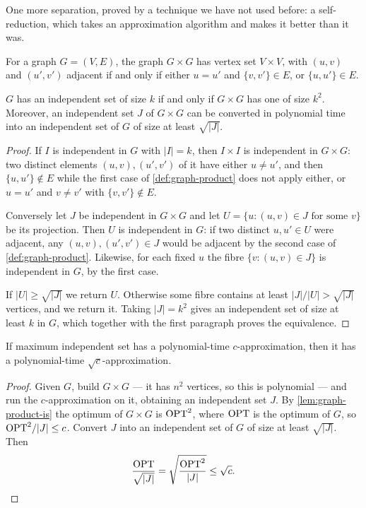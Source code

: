 One more separation, proved by a technique we have not used before: a
self-reduction, which takes an approximation algorithm and makes it better than
it was.

\begin{definition}\label{def:graph-product}
For a graph $G = (V,E)$, the graph $G \times G$ has vertex set $V \times V$,
with $(u,v)$ and $(u',v')$ adjacent if and only if either $u = u'$ and
$\{v,v'\} \in E$, or $\{u,u'\} \in E$.
\end{definition}

\begin{lemma}\label{lem:graph-product-is}
$G$ has an independent set of size $k$ if and only if $G \times G$ has one of
size $k^2$. Moreover, an independent set $J$ of $G \times G$ can be converted in
polynomial time into an independent set of $G$ of size at least $\sqrt{|J|}$.
\end{lemma}

\begin{proof}
If $I$ is independent in $G$ with $|I| = k$, then $I \times I$ is independent in
$G \times G$: two distinct elements $(u,v),(u',v')$ of it have either $u \ne u'$,
and then $\{u,u'\} \notin E$ while the first case of \cref{def:graph-product}
does not apply either, or $u = u'$ and $v \ne v'$ with $\{v,v'\} \notin E$.

Conversely let $J$ be independent in $G \times G$ and let
$U = \{u : (u,v) \in J \text{ for some } v\}$ be its projection. Then $U$ is
independent in $G$: if two distinct $u,u' \in U$ were adjacent, any
$(u,v),(u',v') \in J$ would be adjacent by the second case of
\cref{def:graph-product}. Likewise, for each fixed $u$ the fibre
$\{v : (u,v) \in J\}$ is independent in $G$, by the first case.

If $|U| \ge \sqrt{|J|}$ we return $U$. Otherwise some fibre contains at least
$|J|/|U| > \sqrt{|J|}$ vertices, and we return it. Taking $|J| = k^2$ gives an
independent set of size at least $k$ in $G$, which together with the first
paragraph proves the equivalence.
\end{proof}

\begin{lemma}\label{lem:is-self-reduction}
If maximum independent set has a polynomial-time $c$-approximation, then it has
a polynomial-time $\sqrt{c}$-approximation.
\end{lemma}

\begin{proof}
Given $G$, build $G \times G$ --- it has $n^2$ vertices, so this is polynomial
--- and run the $c$-approximation on it, obtaining an independent set $J$. By
\cref{lem:graph-product-is} the optimum of $G \times G$ is $\mathrm{OPT}^2$, where
$\mathrm{OPT}$ is the optimum of $G$, so $\mathrm{OPT}^2 / |J| \le c$. Convert $J$ into an
independent set of $G$ of size at least $\sqrt{|J|}$. Then
\[ \frac{\mathrm{OPT}}{\sqrt{|J|}} = \sqrt{\frac{\mathrm{OPT}^2}{|J|}} \le \sqrt{c}. \qedhere \]
\end{proof}

